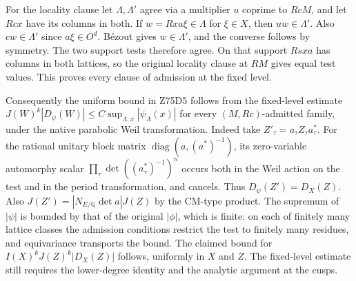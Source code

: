 For the locality clause let $\Lambda,\Lambda'$ agree via a multiplier
$u$ coprime to $RcM$, and let $Rcx$ have its columns in both.
If $w=Rxa\xi\in\Lambda$ for $\xi\in X$, then $uw\in\Lambda'$.
Also $cw\in\Lambda'$ since $a\xi\in O^d$. B\'ezout gives
$w\in\Lambda'$, and the converse follows by symmetry. The two support
tests therefore agree. On that support $Rsxa$ has columns in both
lattices, so the original locality clause at $RM$ gives equal test
values. This proves every clause of admission at the fixed level.

Consequently the uniform bound in Z75D5 follows from the fixed-level
estimate $J(W)^k|D_\psi(W)|\le C\sup_{\Lambda,x}|\psi_\Lambda(x)|$
for every $(M,Rc)$-admitted family, under the native parabolic Weil
transformation. Indeed take $Z'_\tau=a_\tau Z_\tau a_\tau^*$.
For the rational unitary block matrix $\operatorname{diag}
(a,(a^*)^{-1})$, its zero-variable automorphy scalar
$\prod_\tau\det((a_\tau^*)^{-1})^n$ occurs both in the Weil action on
the test and in the period transformation, and cancels. Thus
$D_\psi(Z')=D_X(Z)$. Also
$J(Z')=|N_{E/\mathbb Q}\det a|J(Z)$ by the CM-type product.
The supremum of $|\psi|$ is bounded by that of the original $|\phi|$,
which is finite: on each of finitely many lattice classes the
admission conditions restrict the test to finitely many residues,
and equivariance transports the bound. The claimed bound for
$I(X)^kJ(Z)^k|D_X(Z)|$ follows, uniformly in $X$ and $Z$.
The fixed-level estimate still requires the lower-degree identity
and the analytic argument at the cusps.
